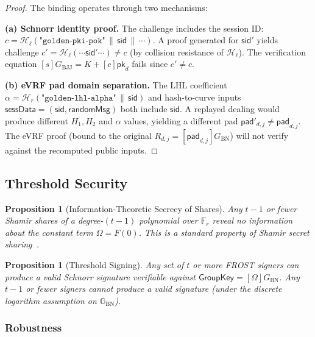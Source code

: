 \documentclass[11pt,a4paper]{article}
\newtheorem{proposition}[theorem]{Proposition}
\newcommand{\F}{\mathbb{F}}
\newcommand{\G}{\mathbb{G}}
\newcommand{\Gbn}{\G_{\mathrm{BN}}}
\newcommand{\Fr}{\F_r}
\newcommand{\genbjj}{G_{\mathrm{BJJ}}}
\newcommand{\genbn}{G_{\mathrm{BN}}}
\newcommand{\pk}{\mathsf{pk}}
\newcommand{\sid}{\mathsf{sid}}
\newcommand{\pad}{\mathsf{pad}}
\newcommand{\hash}{\mathcal{H}}
\begin{document}
\begin{proof}
  The binding operates through two mechanisms:

  \smallskip\noindent\textbf{(a) Schnorr identity proof.}
  The challenge includes the session ID:
  $c = \hash_\ell(\texttt{"golden-pki-pok"} \,\|\, \sid \,\|\, \cdots)$.
  A proof generated for $\sid'$ yields challenge $c' = \hash_\ell(\cdots
  \sid' \cdots) \ne c$ (by collision resistance of $\hash_\ell$). The
  verification equation $[s]\genbjj = K + [c]\pk_d$ fails since $c' \ne c$.

  \smallskip\noindent\textbf{(b) eVRF pad domain separation.}
  The LHL coefficient $\alpha = \hash_r(\texttt{"golden-lhl-alpha"} \,\|\,
  \sid)$ and hash-to-curve inputs $\mathsf{sessData} = (\sid,
  \mathsf{randomMsg})$ both include $\sid$. A replayed dealing would produce
  different $H_1, H_2$ and $\alpha$ values, yielding a different pad
  $\pad'_{d,j} \ne \pad_{d,j}$. The eVRF proof (bound to the original
  $R_{d,j} = [\pad_{d,j}]\genbn$) will not verify against the recomputed
  public inputs.
\end{proof}

\subsection{Threshold Security}
\label{sec:threshold}

\begin{proposition}[Information-Theoretic Secrecy of Shares]
  Any $t - 1$ or fewer Shamir shares of a degree-$(t-1)$ polynomial over $\Fr$
  reveal no information about the constant term $\Omega = F(0)$. This is a
  standard property of Shamir secret sharing~\cite{shamir1979}.
\end{proposition}

\begin{proposition}[Threshold Signing]
  Any set of $t$ or more FROST signers can produce a valid Schnorr signature
  verifiable against $\mathsf{GroupKey} = [\Omega]\genbn$. Any $t - 1$ or fewer
  signers cannot produce a valid signature (under the discrete logarithm
  assumption on $\Gbn$).
\end{proposition}

\subsubsection{Robustness}
\label{sec:robustness}
\end{document}
